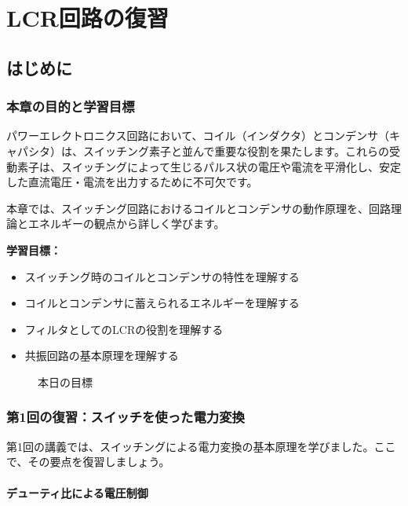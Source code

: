 \chapter{LCR回路の復習}

\section{はじめに}

\subsection{本章の目的と学習目標}

パワーエレクトロニクス回路において、コイル（インダクタ）とコンデンサ（キャパシタ）は、スイッチング素子と並んで重要な役割を果たします。これらの受動素子は、スイッチングによって生じるパルス状の電圧や電流を平滑化し、安定した直流電圧・電流を出力するために不可欠です。

本章では、スイッチング回路におけるコイルとコンデンサの動作原理を、回路理論とエネルギーの観点から詳しく学びます。

\textbf{学習目標：}
\begin{itemize}
\item スイッチング時のコイルとコンデンサの特性を理解する
\item コイルとコンデンサに蓄えられるエネルギーを理解する
\item フィルタとしてのLCRの役割を理解する
\item 共振回路の基本原理を理解する
\end{itemize}

\begin{figure}[H]
\centering
{}
\caption{本日の目標}
\label{fig:ch04_objectives}
\end{figure}

\subsection{第1回の復習：スイッチを使った電力変換}

第1回の講義では、スイッチングによる電力変換の基本原理を学びました。ここで、その要点を復習しましょう。

\subsubsection{デューティ比による電圧制御}

